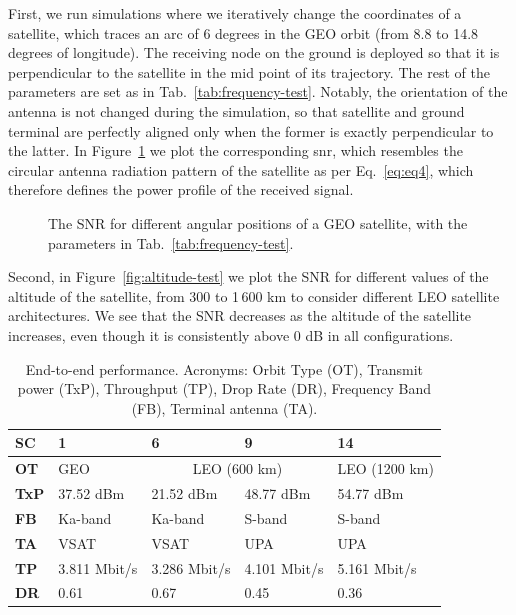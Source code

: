 First, we run simulations where we iteratively change the coordinates of a satellite, which traces an arc of 6 degrees in the GEO orbit (from 8.8 to 14.8 degrees of longitude). %
The receiving node on the ground is deployed so that it is perpendicular to the satellite in the mid point of its trajectory. The rest of the parameters are set as in Tab.~\ref{tab:frequency-test}. Notably, the orientation of the antenna is not changed during the simulation, so that satellite and ground terminal are perfectly aligned only when the former is exactly perpendicular to the latter. 
In Figure~\ref{fig:movement-test} we plot the corresponding \gls{snr}, which resembles the circular antenna radiation pattern of the satellite as per Eq.~\eqref{eq:eq4}, which therefore defines the power profile of the received signal.

\begin{figure}[t]
    \centering 
    \setlength{}
    \setlength{}
    
    \caption{The SNR for different angular positions of a GEO satellite, with the parameters in Tab.~\ref{tab:frequency-test}.}
    \label{fig:movement-test}
\end{figure}

Second, in Figure~\ref{fig:altitude-test} we plot the SNR for different  values of the altitude of the satellite, from 300 to 1\,600 km to consider different LEO satellite architectures. We see that the SNR decreases as the altitude of the satellite increases, even though it is consistently above 0 dB in all configurations.

\begin{table}[t]
\caption{End-to-end performance. Acronyms: Orbit Type (OT), Transmit power (TxP), Throughput (TP), Drop Rate (DR), Frequency Band (FB), Terminal antenna (TA).}
\label{tab:systemlev}
\centering
\footnotesize
\begin{tabular}{|l|l|l|l|l|}
\hline
\textbf{SC} & \textbf{1} & \textbf{6} & \textbf{9} & \textbf{14} \\ \hline
\textbf{OT}       & GEO & \multicolumn{2}{c|}{LEO (600 km)} & LEO (1200 km) \\ \hline
\textbf{TxP}       & 37.52 dBm & 21.52 dBm & 48.77 dBm & 54.77 dBm \\ \hline
\textbf{FB} & Ka-band   & Ka-band   & S-band    & S-band    \\ \hline
\textbf{TA}    & VSAT      & VSAT      & UPA  & UPA  \\ \hline
\textbf{TP}     & 3.811 Mbit/s   & 3.286 Mbit/s      & 4.101 Mbit/s      & 5.161 Mbit/s        \\ \hline
\textbf{DR}      & 0.61      & 0.67      & 0.45      & 0.36      \\ \hline
\end{tabular}
\end{table}


